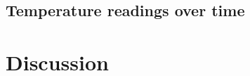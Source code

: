 \documentclass[a4paper,12pt]{article}
\begin{document}
\subsection{Temperature readings over time}


\section{Discussion}
\end{document}
